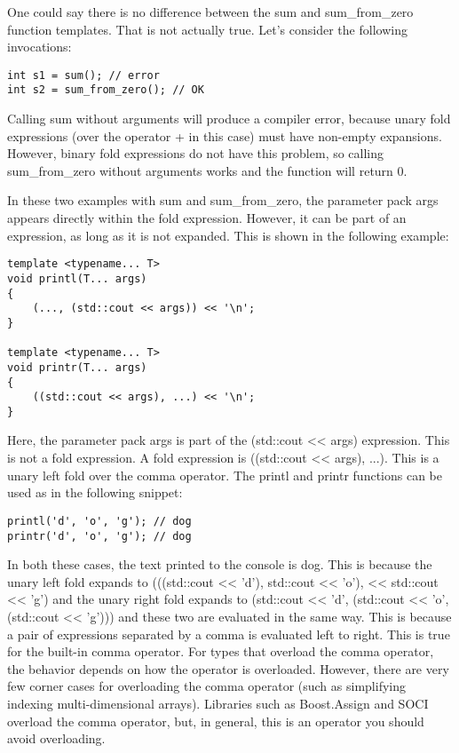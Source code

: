 One could say there is no difference between the sum and sum\_from\_zero function templates. That is not actually true. Let's consider the following invocations:

\begin{lstlisting}[style=styleCXX]
int s1 = sum(); // error
int s2 = sum_from_zero(); // OK
\end{lstlisting}

Calling sum without arguments will produce a compiler error, because unary fold expressions (over the operator + in this case) must have non-empty expansions. However, binary fold expressions do not have this problem, so calling sum\_from\_zero without arguments works and the function will return 0.

In these two examples with sum and sum\_from\_zero, the parameter pack args appears directly within the fold expression. However, it can be part of an expression, as long as it is not expanded. This is shown in the following example:

\begin{lstlisting}[style=styleCXX]
template <typename... T>
void printl(T... args)
{
	(..., (std::cout << args)) << '\n';
}

template <typename... T>
void printr(T... args)
{
	((std::cout << args), ...) << '\n';
}
\end{lstlisting}

Here, the parameter pack args is part of the (std::cout << args) expression. This is not a fold expression. A fold expression is ((std::cout << args), ...). This is a unary left fold over the comma operator. The printl and printr functions can be used as in the following snippet:

\begin{lstlisting}[style=styleCXX]
printl('d', 'o', 'g'); // dog
printr('d', 'o', 'g'); // dog
\end{lstlisting}

In both these cases, the text printed to the console is dog. This is because the unary left fold expands to (((std::cout << 'd'), std::cout << 'o'), << std::cout << 'g') and the unary right fold expands to (std::cout << 'd', (std::cout << 'o', (std::cout << 'g'))) and these two are evaluated in the same way. This is because a pair of expressions separated by a comma is evaluated left to right. This is true for the built-in comma operator. For types that overload the comma operator, the behavior depends on how the operator is overloaded. However, there are very few corner cases for overloading the comma operator (such as simplifying indexing multi-dimensional arrays). Libraries such as Boost.Assign and SOCI overload the comma operator, but, in general, this is an operator you should avoid overloading.

